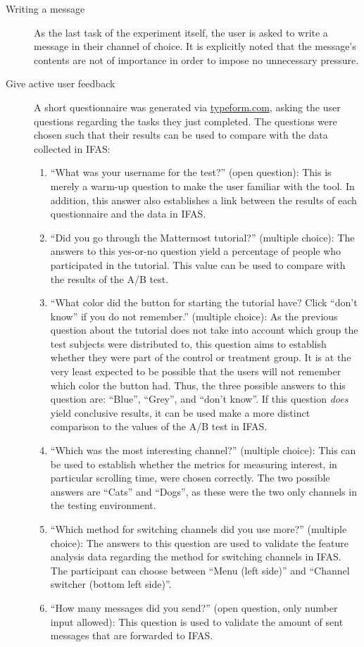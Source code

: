 \begin{description}
\item [Writing a message] As the last task of the experiment itself, the user is asked to write a message in their channel of choice.
It is explicitly noted that the message's contents are not of importance in order to impose no unnecessary pressure.

\item [Give active user feedback] A short questionnaire was generated via \url{typeform.com}, asking the user questions regarding the tasks they just completed.
The questions were chosen such that their results can be used to compare with the data collected in \ac{IFAS}:

\begin{enumerate}
\item ``What was your username for the test?'' (open question):
This is merely a warm-up question to make the user familiar with the tool.
In addition, this answer also establishes a link between the results of each questionnaire and the data in \ac{IFAS}.
\item ``Did you go through the Mattermost tutorial?'' (multiple choice):
The answers to this yes-or-no question yield a percentage of people who participated in the tutorial.
This value can be used to compare with the results of the A/B test.
\item ``What color did the button for starting the tutorial have? Click ``don't know'' if you do not remember.'' (multiple choice):
As the previous question about the tutorial does not take into account which group the test subjects were distributed to, this question aims to establish whether they were part of the control or treatment group.
It is at the very least expected to be possible that the users will not remember which color the button had.
Thus, the three possible answers to this question are: ``Blue'', ``Grey'', and ``don't know''.
If this question \emph{does} yield conclusive results, it can be used make a more distinct comparison to the values of the A/B test in \ac{IFAS}.
\item ``Which was the most interesting channel?'' (multiple choice):
This can be used to establish whether the metrics for measuring interest, in particular scrolling time, were chosen correctly.
The two possible answers are ``Cats'' and ``Dogs'', as these were the two only channels in the testing environment.
\item ``Which method for switching channels did you use more?'' (multiple choice):
The answers to this question are used to validate the feature analysis data regarding the method for switching channels in \ac{IFAS}.
The participant can choose between ``Menu (left side)'' and ``Channel switcher (bottom left side)''.
\item ``How many messages did you send?'' (open question, only number input allowed):
This question is used to validate the amount of sent messages that are forwarded to \ac{IFAS}.
\end{enumerate}

\end{description}

